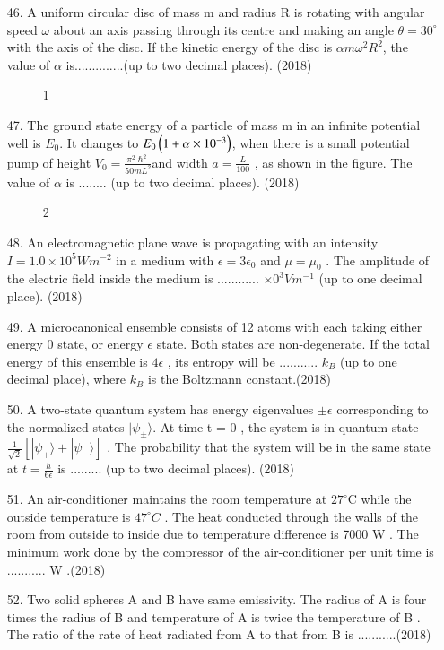 \documentclass[journal]{IEEEtran}
\begin{document}
\begin{enumerate}
    \item[46.] A uniform circular disc of mass m and radius R is rotating with angular
    speed $\omega$ about an axis passing through its centre and making an angle
    $\theta = 30^{\circ}$ with the axis of the disc. If the kinetic energy of the disc is $\alpha m\omega^2 R^2$, the value of $\alpha$ is..............(up to two decimal places). \hfill (2018)
    \begin{figure}[!ht]
        \centering
        \caption{1}
    \end{figure}
    \newpage
    \item[47.] The ground state energy of a particle of mass m in an infinite potential well is $E_0$. It
    changes to $E_0\left(1+\alpha\times 10^{-3}\right)$, when there is a small potential pump of height $V_0 =\frac{\pi^2 \hslash^2}{50mL^2}$and width $a=\frac{L}{100}$ , as shown in the figure. The value of $\alpha$ is ........ (up to two
    decimal places). \hfill (2018)
    \begin{figure}[!ht]
        \centering
        \caption{2}
    \end{figure}
    \item[48.] An electromagnetic plane wave is propagating with an intensity $I = 1.0\times 10^5 Wm^{-2}$ in a
    medium with $\epsilon = 3\epsilon_0$ and $\mu = \mu_0$ . The amplitude of the electric field inside the medium
    is ............ $\times0^3Vm^{-1}$ (up to one decimal place). \hfill (2018)
    \item[49.]  A microcanonical ensemble consists of 12 atoms with each taking either energy 0 state,
    or energy $\epsilon$ state. Both states are non-degenerate. If the total energy of this ensemble is
    $4\epsilon$ , its entropy will be ........... $k_B$ (up to one decimal place), where $k_B$ is the
    Boltzmann constant.\hfill (2018)
    \item[50.] A two-state quantum system has energy eigenvalues $\pm \epsilon$ corresponding to the normalized
    states $|\psi_{\pm}\rangle$. At time t = 0 , the system is in quantum state $\frac{1}{\sqrt{2}}[|\psi_{+}\rangle+|\psi_{-}\rangle]$ . The
    probability that the system will be in the same state at $t=\frac{h}{6\epsilon}$ is .........  (up to
    two decimal places). \hfill (2018)
    \item[51.] An air-conditioner maintains the room temperature at $27^{\circ}$C while the outside temperature
    is  $47^{\circ} C$ . The heat conducted through the walls of the room from outside to inside due to
    temperature difference is 7000 W . The minimum work done by the compressor of the
    air-conditioner per unit time is ........... W .\hfill (2018)
    \item[52.] Two solid spheres A and B have same emissivity. The radius of A is four times the
    radius of B and temperature of A is twice the temperature of B . The ratio of the rate of
    heat radiated from A to that from B is ...........\hfill (2018)
\end{enumerate}
\end{document}
